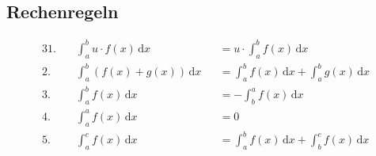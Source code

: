 \subsection{Rechenregeln}

\begin{gesetz}
    \begin{alignat*}{3}
        \text{1.}\quad & \int_a^b u \cdot f(x) \,\mathrm{d}x &&= u \cdot \int_a^b f(x) \,\mathrm{d}x \\
        \text{2.}\quad & \int_a^b \left( f(x) + g(x) \right) \,\mathrm{d}x &&= \int_a^b f(x) \,\mathrm{d}x + \int_a^b g(x) \,\mathrm{d}x \\
        \text{3.}\quad & \int_a^b f(x) \,\mathrm{d}x &&= -\int_b^a f(x) \,\mathrm{d}x \\
        \text{4.}\quad & \int_a^a f(x) \,\mathrm{d}x &&= 0 \\
        \text{5.}\quad & \int_a^c f(x) \,\mathrm{d}x &&= \int_a^b f(x) \,\mathrm{d}x + \int_b^c f(x) \,\mathrm{d}x
    \end{alignat*}
\end{gesetz}
